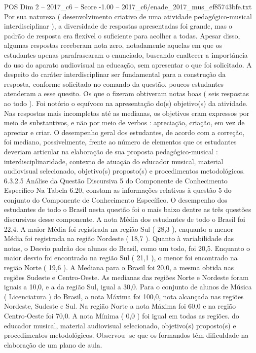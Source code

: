 \begin{textsample}{POS Dim 2 – 2017\_c6 – Score -1.00 – 2017\_c6/enade\_2017\_mus\_ef85743bfe.txt}
Por sua natureza ( desenvolvimento criativo de uma atividade pedagógico-musical interdisciplinar ), a diversidade de respostas apresentadas foi grande, mas o padrão de resposta era flexível o suficiente para acolher a todas.
Apesar disso, algumas respostas receberam nota zero, notadamente aquelas em que os estudantes apenas parafrasearam o enunciado, buscando enaltecer a importância do uso do aparato audiovisual na educação, sem apresentar o que foi solicitado.
A despeito do caráter interdisciplinar ser fundamental para a construção da resposta, conforme solicitado no comando da questão, poucos estudantes atenderam a esse quesito.
Os que o fizeram obtiveram notas boas ( seis respostas ao todo ).
Foi notório o equívoco na apresentação do(s) objetivo(s) da atividade.
Nas respostas mais incompletas até as medianas, os objetivos eram expressos por meio de substantivos, e não por meio de verbos : apreciação, criação, em vez de apreciar e criar.
O desempenho geral dos estudantes, de acordo com a correção, foi mediano, possivelmente, frente ao número de elementos que os estudantes deveriam articular na elaboração de sua proposta pedagógico-musical : interdisciplinaridade, contexto de atuação do educador musical, material audiovisual selecionado, objetivo(s) proposto(s) e procedimentos metodológicos. 6.3.2.5 Análise da Questão Discursiva 5 do Componente de Conhecimento Específico Na Tabela 6.20, constam as informações relativas à questão 5 do conjunto do Componente de Conhecimento Específico.
O desempenho dos estudantes de todo o Brasil nesta questão foi o mais baixo dentre as três questões discursivas desse componente.
A nota Média dos estudantes de todo o Brasil foi 22,4.
A maior Média foi registrada na região Sul ( 28,3 ), enquanto a menor Média foi registrada na região Nordeste ( 18,7 ).
Quanto à variabilidade das notas, o Desvio padrão dos alunos do Brasil, como um todo, foi 20,5.
Enquanto o maior desvio foi encontrado na região Sul ( 21,1 ), o menor foi encontrado na região Norte ( 19,6 ).
A Mediana para o Brasil foi 20,0, a mesma obtida nas regiões Sudeste e Centro-Oeste.
As medianas das regiões Norte e Nordeste foram iguais a 10,0, e a da região Sul, igual a 30,0.
Para o conjunto de alunos de Música ( Licenciatura ) do Brasil, a nota Máxima foi 100,0, nota alcançada nas regiões Nordeste, Sudeste e Sul.
Na região Norte a nota Máxima foi 60,0 e na região Centro-Oeste foi 70,0.
A nota Mínima ( 0,0 ) foi igual em todas as regiões. do educador musical, material audiovisual selecionado, objetivo(s) proposto(s) e procedimentos metodológicos.
Observou -se que os formandos têm dificuldade na elaboração de um plano de aula.

\end{textsample}

